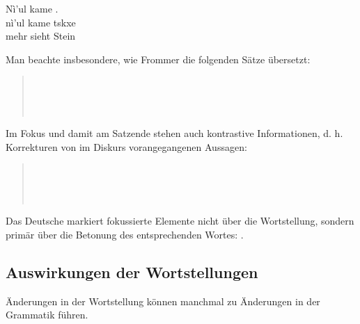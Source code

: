 \begin{interlin}
	\glll Nì'ul kame . \\
	nì'ul kame tskxe \\
	mehr sieht Stein \\
\end{interlin}

\noindent Man beachte insbesondere, wie Frommer die folgenden Sätze übersetzt:

\begin{quotation}
	\noindent{}\\
	\indent{}\\
	
	\noindent{}\\
	\indent{}
\end{quotation}

\noindent Im Fokus und damit am Satzende stehen auch kontrastive Informationen, d. h. Korrekturen von im Diskurs vorangegangenen Aussagen:

\begin{quotation}
	\noindent{}\\
	\indent{}\\
	
	\noindent{}\\
	\indent{}
\end{quotation}

\noindent Das Deutsche markiert fokussierte Elemente nicht über die Wortstellung, sondern primär über die Betonung des entsprechenden Wortes: .


\subsection{Auswirkungen der Wortstellungen}  Änderungen in der Wortstellung können manchmal zu Änderungen in der Grammatik führen. \label{pragma:woe}

